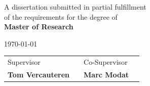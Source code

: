 \documentclass[a4paper,10pt]{book}
\theoremstyle{definition}
\begin{document}
\begin{titlepage}
\vspace{1.5cm}

\begin{center}
	A dissertation submitted in partial fulfillment 
	\\
	of the requirements for the degree of
	\\ 
	{\bf Master of Research}	
\end{center}

\vspace{0.2cm}
\begin{center}
	\today
\end{center}

\vspace{1.0cm}

\begin{center}
\begin{tabular}{l p{3.3cm} l l}
	
	Supervisor& & Co-Supervisor \\
	\textbf{Tom Vercauteren} & & \textbf{Marc Modat}  \\
	
\end{tabular}
\end{center}

\par
\vfill\par 

\endgroup


\end{titlepage}




 



\pagestyle{plain}  
\tableofcontents



\end{document}
